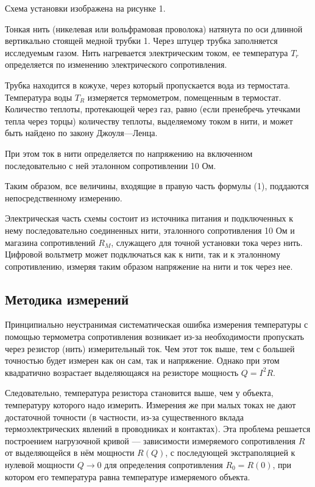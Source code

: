 \documentclass[a4paper, 12pt]{article} %
\begin{document}
Схема установки изображена на рисунке 1. 

Тонкая нить (никелевая или вольфрамовая проволока) натянута по оси длинной вертикально стоящей медной трубки 1. Через штуцер трубка заполняется исследуемым газом. Нить нагревается электрическим током, ее температура $T_r$ определяется по изменению электрического сопротивления. 

Трубка находится в кожухе, через который пропускается вода из термостата. Температура воды $T_R$ измеряется термометром, помещенным в термостат. Количество теплоты, протекающей через газ, равно (если пренебречь утечками тепла через торцы) количеству теплоты, выделяемому током в нити, и может быть найдено по закону Джоуля—Ленца. 

При этом ток в нити определяется по напряжению на включенном последовательно с ней
эталонном сопротивлении 10 Ом. 

Таким образом, все величины, входящие в правую часть формулы (1), поддаются непосредственному
измерению.


Электрическая часть схемы состоит из источника питания и подключенных к нему последовательно соединенных нити, эталонного
сопротивления 10 Ом и магазина сопротивлений $R_M$, служащего для
точной установки тока через нить. Цифровой вольтметр может подключаться как к нити, так и к эталонному сопротивлению, измеряя
таким образом напряжение на нити и ток через нее.

\subsection{Методика измерений}

Принципиально неустранимая систематическая
ошибка измерения температуры с помощью термометра сопротивления возникает из-за необходимости пропускать через резистор (нить) измерительный ток. Чем этот ток выше, тем с большей точностью будет измерен как он сам, так и напряжение. Однако при этом квадратично возрастает выделяющаяся на
резисторе мощность $Q = I^2 R$. 

Следовательно, температура резистора
становится выше, чем у объекта, температуру которого надо измерить. Измерения же при малых токах не дают достаточной точности (в частности, из-за
существенного вклада термоэлектрических явлений в проводниках и контактах). Эта проблема решается построением нагрузочной кривой — зависимости измеряемого сопротивления $R$ от выделяющейся в нём мощности $R(Q)$, с последующей экстраполяцией к нулевой мощности $Q \rightarrow 0$ для определения сопротивления $R_0 = R(0)$, при котором его температура равна температуре измеряемого объекта. 
\end{document}
